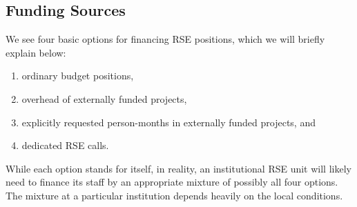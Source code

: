 \documentclass[10pt,letterpaper]{article}
\begin{document}
\subsection*{Funding Sources}%
\label{sec:funding}

We see four basic options for financing RSE positions, which we will briefly explain below:
\begin{enumerate}
\item ordinary budget positions,
\item overhead of externally funded projects,
\item explicitly requested person-months in externally funded projects, and
\item dedicated RSE calls.
\end{enumerate}
While each option stands for itself, in reality, an institutional RSE unit will likely need to finance its staff by an appropriate mixture of possibly all four options.
The mixture at a particular institution depends heavily on the local conditions.
\end{document}
